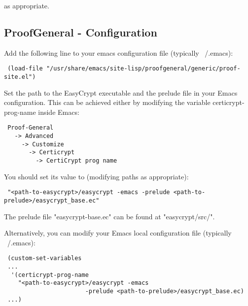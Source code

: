 as appropriate.


\subsection{ProofGeneral - Configuration}

Add the following line to your emacs configuration file (typically ~/.emacs):

\begin{verbatim}
 (load-file "/usr/share/emacs/site-lisp/proofgeneral/generic/proof-site.el")
\end{verbatim}

Set the path to the EasyCrypt executable and the prelude file in your
Emacs configuration. This can be achieved either by modifying the
variable certicrypt-prog-name inside Emacs:

\begin{verbatim}
 Proof-General
   -> Advanced 
     -> Customize 
       -> Certicrypt 
         -> CertiCrypt prog name
\end{verbatim}

You should set its value to (modifying paths as appropriate):

\begin{verbatim}
 "<path-to-easycrypt>/easycrypt -emacs -prelude <path-to-prelude>/easycrypt_base.ec"
\end{verbatim}

The prelude file "easycrypt-base.ec" can be found at "easycrypt/src/".

Alternatively, you can modify your Emacs local configuration file
(typically ~/.emacs):

\begin{verbatim}
 (custom-set-variables
 ...
  '(certicrypt-prog-name 
    "<path-to-easycrypt>/easycrypt -emacs
        			   -prelude <path-to-prelude>/easycrypt_base.ec)
 ...)
\end{verbatim}






